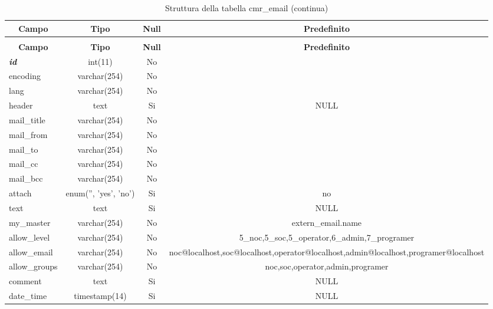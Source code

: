 %
%
 \begin{longtable}{|l|c|c|c|} 
 \caption{Struttura della tabella cmr\_email} \label{tab:cmr_email-structure} \\
 \hline \multicolumn{1}{|c|}{\textbf{Campo}} & \multicolumn{1}{|c|}{\textbf{Tipo}} & \multicolumn{1}{|c|}{\textbf{Null}} & \multicolumn{1}{|c|}{\textbf{Predefinito}} \\ \hline \hline
\endfirsthead
 \caption{Struttura della tabella cmr\_email (continua)} \\ 
 \hline \multicolumn{1}{|c|}{\textbf{Campo}} & \multicolumn{1}{|c|}{\textbf{Tipo}} & \multicolumn{1}{|c|}{\textbf{Null}} & \multicolumn{1}{|c|}{\textbf{Predefinito}} \\ \hline \hline \endhead \endfoot \textbf{\textit{id}} & int(11) &  No  &  \\ \hline 
encoding & varchar(254) &  No  &  \\ \hline 
lang & varchar(254) &  No  &  \\ \hline 
header & text &  Si  & NULL \\ \hline 
mail\_title & varchar(254) &  No  &  \\ \hline 
mail\_from & varchar(254) &  No  &  \\ \hline 
mail\_to & varchar(254) &  No  &  \\ \hline 
mail\_cc & varchar(254) &  No  &  \\ \hline 
mail\_bcc & varchar(254) &  No  &  \\ \hline 
attach & enum('', 'yes', 'no') &  Si  & no \\ \hline 
text & text &  Si  & NULL \\ \hline 
my\_master & varchar(254) &  No  & extern\_email.name \\ \hline 
allow\_level & varchar(254) &  No  & 5\_noc,5\_soc,5\_operator,6\_admin,7\_programer \\ \hline 
allow\_email & varchar(254) &  No  & noc@localhost,soc@localhost,operator@localhost,admin@localhost,programer@localhost \\ \hline 
allow\_groups & varchar(254) &  No  & noc,soc,operator,admin,programer \\ \hline 
comment & text &  Si  & NULL \\ \hline 
date\_time & timestamp(14) &  Si  & NULL \\ \hline 
 \end{longtable}


